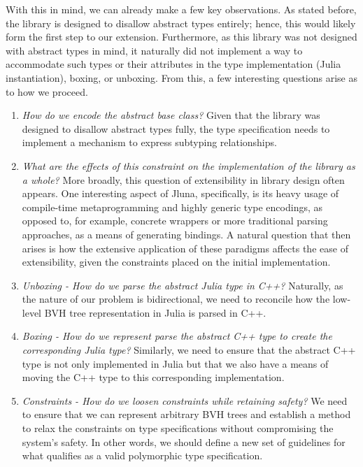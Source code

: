 With this in mind, we can already make a few key observations. As stated before, the library is designed to disallow abstract types entirely; hence, this would likely form the first step to our extension. Furthermore, as this library was not designed with abstract types in mind, it naturally did not implement a way to accommodate such types or their attributes in the type implementation (Julia instantiation), boxing, or unboxing. From this, a few interesting questions arise as to how we proceed.

\begin{enumerate}
  \item \textit{How do we encode the abstract base class?} Given that the library was designed to disallow abstract types fully, the type specification needs to implement a mechanism to express subtyping relationships.
  \item \textit{What are the effects of this constraint on the implementation of the library as a whole?} More broadly, this question of extensibility in library design often appears. One interesting aspect of Jluna, specifically, is its heavy usage of compile-time metaprogramming and highly generic type encodings, as opposed to, for example, concrete wrappers or more traditional parsing approaches, as a means of generating bindings. A natural question that then arises is how the extensive application of these paradigms affects the ease of extensibility, given the constraints placed on the initial implementation.
  \item \textit{Unboxing - How do we parse the abstract Julia type in C++?} Naturally, as the nature of our problem is bidirectional, we need to reconcile how the low-level BVH tree representation in Julia is parsed in C++.
  \item \textit{Boxing - How do we represent parse the abstract C++ type to create the corresponding Julia type?} Similarly, we need to ensure that the abstract C++ type is not only implemented in Julia but that we also have a means of moving the C++ type to this corresponding implementation.
  \item \textit{Constraints - How do we loosen constraints while retaining safety?} We need to ensure that we can represent arbitrary BVH trees and establish a method to relax the constraints on type specifications without compromising the system's safety. In other words, we should define a new set of guidelines for what qualifies as a valid polymorphic type specification.
\end{enumerate}

